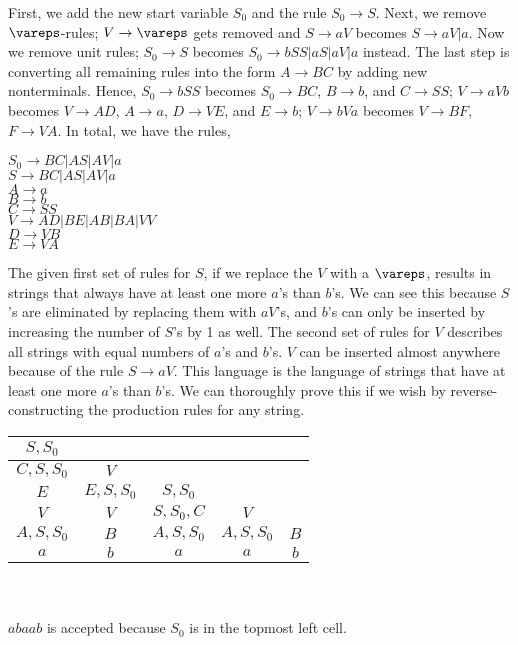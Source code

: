 \documentclass[solution, letterpaper]{cs121}
\begin{document}
\begin{solution}
\subsolution First, we add the new start variable $S_0$ and the rule $S_0 \rightarrow S$.  Next, we remove $\vareps$-rules; $V\rightarrow \vareps$ gets removed and $S \rightarrow aV$ becomes $S \rightarrow aV | a$.  Now we remove unit rules; $S_0 \rightarrow S$ becomes $S_0 \rightarrow bSS | aS | aV | a$ instead.  The last step is converting all remaining rules into the form $A \rightarrow BC$ by adding new nonterminals.  Hence, $S_0 \rightarrow bSS$ becomes $S_0 \rightarrow BC$, $B \rightarrow b$, and $C \rightarrow SS$; $V \rightarrow aVb$ becomes $V \rightarrow AD$, $A \rightarrow a$, $D \rightarrow VE$, and $E \rightarrow b$; $V \rightarrow bVa$ becomes $V \rightarrow BF$, $F \rightarrow VA$.  In total, we have the rules,

\begin{center}
	$S_0 \rightarrow BC | AS | AV | a$\\
	$S \rightarrow BC | AS | AV | a$\\
	$A \rightarrow a$\\
	$B \rightarrow b$\\
	$C \rightarrow SS$\\
	$V \rightarrow AD | BE | AB | BA | VV$\\
	$D \rightarrow VB$\\
	$E \rightarrow VA$\\
\end{center}

\subsolution The given first set of rules for $S$, if we replace the $V$ with a $\vareps$, results in strings that always have at least one more $a$'s than $b$'s.  We can see this because $S$'s are eliminated by replacing them with $aV$'s, and $b$'s can only be inserted by increasing the number of $S$'s by 1 as well.  The second set of rules for $V$ describes all strings with equal numbers of $a$'s and $b$'s.  $V$ can be inserted almost anywhere because of the rule $S \rightarrow aV$.  This language is the language of strings that have at least one more $a$'s than $b$'s.  We can thoroughly prove this if we wish by reverse-constructing the production rules for any string.

\subsolution 
\begin{tabular}{|c|c|c|c|c|}\hline
$S,S_0$		&			&			&			&\\\hline
$C,S,S_0$		&$V$		&			&			&\\\hline
$E$			&$E,S,S_0$	&$S,S_0$		&			&\\\hline
$V$			&$V$		&$S,S_0,C$	&$V$		&\\\hline
$A,S,S_0$		&$B$		&$A,S,S_0$	&$A,S,S_0$	&$B$\\\hline
$a$			&$b$			&$a$			&$a$			&$b$\\\hline
\end{tabular}
\\\\$abaab$ is accepted because $S_0$ is in the topmost left cell.
\vspace{0.4cm}


\end{solution}
\end{document}
